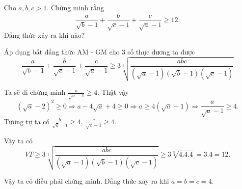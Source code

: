 \begin{problem}
	Cho $a, b, c > 1$. Chứng minh rằng
	\[
		\frac{a}{\sqrt{b} - 1} + \frac{b}{\sqrt{c} - 1} + \frac{c}{\sqrt{a} - 1} \ge 12.
	\]
	Đẳng thức xảy ra khi nào?


	\solution 

	Áp dụng bất đẳng thức AM - GM cho 3 số thực dương ta được
	\[
		\frac{a}{\sqrt{b} - 1} + \frac{b}{\sqrt{c} - 1} + \frac{c}{\sqrt{a} - 1} \ge 
		3\sqrt[3]{\frac{abc}{(\sqrt{a} - 1)(\sqrt{b} - 1)(\sqrt{c} - 1)}}
	\]

	Ta sẽ đi chứng minh $\displaystyle \frac{a}{\sqrt{a} - 1} \ge 4$. Thật vậy
	\[
		(\sqrt{a} - 2)^2 \ge 0 \Rightarrow a - 4\sqrt{a} + 4 \ge 0 \Rightarrow 
		a \ge 4(\sqrt{a} - 1) \Rightarrow \frac{a}{\sqrt{a} - 1} \ge 4.
	\]
	Tương tự ta có $\displaystyle \frac{b}{\sqrt{b} - 1} \ge 4,\ \frac{c}{\sqrt{c} - 1} \ge 4$.

	Vậy ta có
	\[
		VT \ge 3\sqrt[3]{\frac{abc}{(\sqrt{a} - 1)(\sqrt{b} - 1)(\sqrt{c} - 1)}} \ge 3\sqrt[3]{4.4.4}
		= 3.4 = 12.
	\]

	Vậy ta có điều phải chứng minh. Đẳng thức xảy ra khi $a = b = c = 4$.

\end{problem}